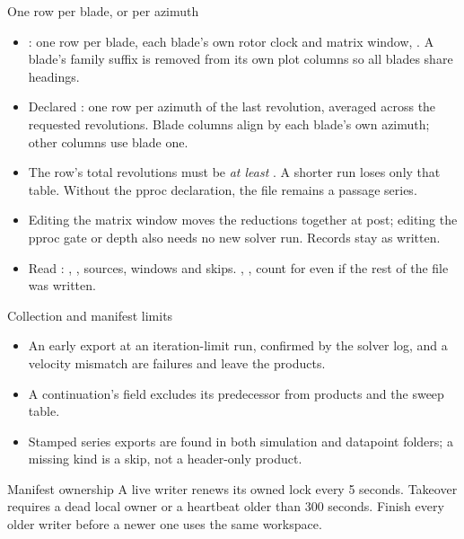 \begin{frame}{One row per blade, or per azimuth}
\begin{itemize}\small
\item {}: one row per blade, each blade's own rotor clock and matrix window,
. A blade's family suffix is
removed from its own plot columns so all blades share headings.
\item Declared : one row per azimuth of the last
revolution, averaged across the requested revolutions. Blade columns align by
each blade's own azimuth; other columns use blade one.
\item The row's total revolutions must be \emph{at least}
. A shorter run loses only that table. Without the
pproc declaration, the file remains a passage series.
\item Editing the matrix window moves the reductions together at post;
editing the pproc gate or depth also needs no new solver run. Records stay as written.
\item Read : , , sources,
windows and skips. , ,  count for
 even if the rest of the file was written.
\end{itemize}
\end{frame}

\begin{frame}{Collection and manifest limits}
\begin{itemize}
\item An early export at an iteration-limit run, confirmed by the solver log,
and a velocity mismatch are failures and leave the products.
\item A continuation's  field excludes its predecessor from
products and the sweep table.
\item Stamped series exports are found in both simulation and datapoint
folders; a missing kind is a skip, not a header-only product.
\end{itemize}
\begin{alertblock}{Manifest ownership}
A live writer renews its owned lock every 5 seconds. Takeover requires a dead
local owner or a heartbeat older than 300 seconds. Finish every older writer
before a newer one uses the same workspace.
\end{alertblock}
\end{frame}


